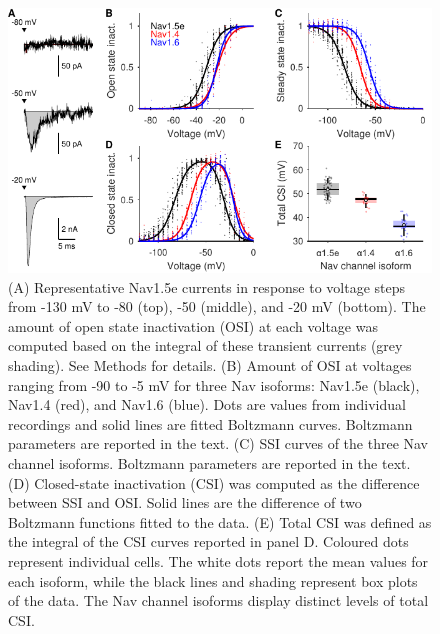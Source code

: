 \begin{figure}[t]
    \centering
    \includegraphics[width=115mm]{Figures/AppendixA/figure06.pdf}
    \caption{
    (A) Representative Nav1.5e currents in response to voltage steps from -130 mV to -80 (top), -50 (middle), and -20 mV (bottom). The amount of open state inactivation (OSI) at each voltage was computed based on the integral of these transient currents (grey shading). See Methods for details.
    (B) Amount of OSI at voltages ranging from -90 to -5 mV for three Nav isoforms: Nav1.5e (black), Nav1.4 (red), and Nav1.6 (blue). Dots are values from individual recordings and solid lines are fitted Boltzmann curves. Boltzmann parameters are reported in the text.
    (C) SSI curves of the three Nav channel isoforms. Boltzmann parameters are reported in the text.
    (D) Closed-state inactivation (CSI) was computed as the difference between SSI and OSI. Solid lines are the difference of two Boltzmann functions fitted to the data. 
    (E) Total CSI was defined as the integral of the CSI curves reported in panel D. Coloured dots represent individual cells. The white dots report the mean values for each isoform, while the black lines and shading represent box plots of the data. The Nav channel isoforms display distinct levels of total CSI.}
\label{fig:A6}
\end{figure}

